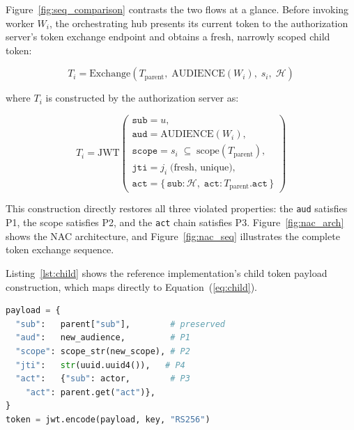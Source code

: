 \documentclass[journal]{IEEEtran}
\theoremstyle{definition}
\begin{document}
Figure~\ref{fig:seq_comparison} contrasts the two flows at a glance.
Before invoking worker $W_i$, the orchestrating hub presents its current token
to the authorization server's token exchange endpoint and obtains a fresh,
narrowly scoped child token:

\begin{equation}
T_i = \mathrm{Exchange}\!\left(
  T_{\mathrm{parent}},\;
  \mathrm{AUDIENCE}(W_i),\;
  s_i,\;
  \mathcal{H}
\right)
\label{eq:exchange}
\end{equation}

where $T_i$ is constructed by the authorization server as:

\begin{equation}
T_i = \mathrm{JWT}\!\left(\begin{array}{l}
  \texttt{sub} = u, \\[2pt]
  \texttt{aud} = \mathrm{AUDIENCE}(W_i), \\[2pt]
  \texttt{scope} = s_i \;\subseteq\; \mathrm{scope}(T_{\mathrm{parent}}), \\[2pt]
  \texttt{jti} = j_i \;\text{(fresh, unique)}, \\[2pt]
  \texttt{act} = \{\,\texttt{sub}\text{:}\,\mathcal{H},\;
                    \texttt{act}\text{:}\,T_{\mathrm{parent}}.\texttt{act}\,\}
\end{array}\right)
\label{eq:child}
\end{equation}

This construction directly restores all three violated properties: the
\texttt{aud} satisfies P1, the scope satisfies P2, and the \texttt{act} chain
satisfies P3. Figure~\ref{fig:nac_arch} shows the NAC architecture, and
Figure~\ref{fig:nac_seq} illustrates the complete token exchange sequence.

Listing~\ref{lst:child} shows the reference implementation's child token
payload construction, which maps directly to Equation~(\ref{eq:child}).

\begin{lstlisting}[language=Python, label=lst:child,
  caption={Child token construction (\texttt{nac\_common.py}).
  Each field enforces one security property.}]
payload = {
  "sub":   parent["sub"],        # preserved
  "aud":   new_audience,         # P1
  "scope": scope_str(new_scope), # P2
  "jti":   str(uuid.uuid4()),   # P4
  "act":   {"sub": actor,        # P3
    "act": parent.get("act")},
}
token = jwt.encode(payload, key, "RS256")
\end{lstlisting}
\end{document}
